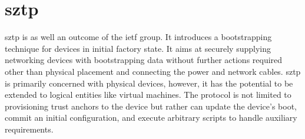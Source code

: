 \section{\acrfull*{sztp}}
\gls{sztp} is as well an outcome of the \gls{ietf} group. 
It introduces a bootstrapping technique for devices in initial factory state.
It aims at securely supplying networking devices with bootstrapping data without further actions required other than physical placement and connecting the power and network cables.
\gls{sztp} is primarily concerned with physical devices, however, it has the potential to be extended to logical entities like virtual machines. 
The protocol is not limited to provisioning trust anchors to the device but rather can update the device's boot, commit an initial configuration, and execute arbitrary scripts to handle auxiliary requirements.



